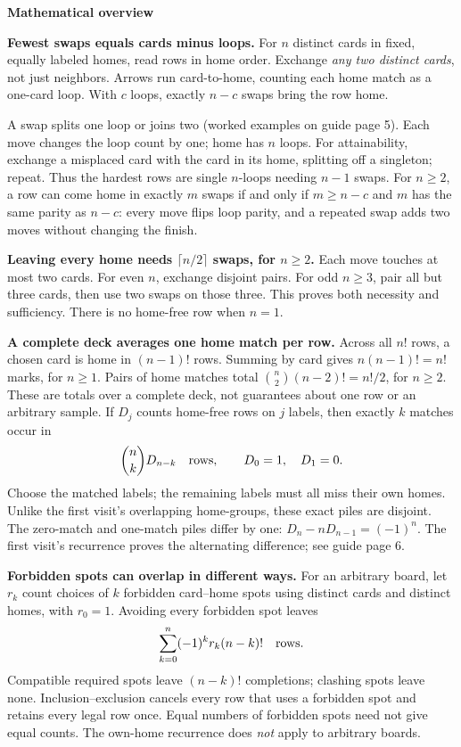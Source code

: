 \documentclass[11pt]{article}
\newcommand{\head}[1]{\par\textbf{\large #1}\par}
\begin{document}
\head{Mathematical overview}
\textbf{Fewest swaps equals cards minus loops.} For $n$ distinct cards in fixed, equally labeled homes, read rows in home order. Exchange \emph{any two distinct cards}, not just neighbors. Arrows run card-to-home, counting each home match as a one-card loop. With $c$ loops, exactly $n-c$ swaps bring the row home.

A swap splits one loop or joins two (worked examples on guide page 5). Each move changes the loop count by one; home has $n$ loops. For attainability, exchange a misplaced card with the card in its home, splitting off a singleton; repeat. Thus the hardest rows are single $n$-loops needing $n-1$ swaps. For $n\ge2$, a row can come home in exactly $m$ swaps if and only if $m\ge n-c$ and $m$ has the same parity as $n-c$: every move flips loop parity, and a repeated swap adds two moves without changing the finish.

\textbf{Leaving every home needs $\lceil n/2\rceil$ swaps, for $n\ge2$.} Each move touches at most two cards. For even $n$, exchange disjoint pairs. For odd $n\ge3$, pair all but three cards, then use two swaps on those three. This proves both necessity and sufficiency. There is no home-free row when $n=1$.

\textbf{A complete deck averages one home match per row.} Across all $n!$ rows, a chosen card is home in $(n-1)!$ rows. Summing by card gives $n(n-1)!=n!$ marks, for $n\ge1$. Pairs of home matches total $\binom n2(n-2)!=n!/2$, for $n\ge2$. These are totals over a complete deck, not guarantees about one row or an arbitrary sample. If $D_j$ counts home-free rows on $j$ labels, then exactly $k$ matches occur in
\[
\binom nk D_{n-k}\quad\hbox{rows},\qquad D_0=1,\quad D_1=0.
\]
Choose the matched labels; the remaining labels must all miss their own homes. Unlike the first visit's overlapping home-groups, these exact piles are disjoint. The zero-match and one-match piles differ by one: $D_n-nD_{n-1}=(-1)^n$. The first visit's recurrence proves the alternating difference; see guide page 6.

\textbf{Forbidden spots can overlap in different ways.} For an arbitrary board, let $r_k$ count choices of $k$ forbidden card--home spots using distinct cards and distinct homes, with $r_0=1$. Avoiding every forbidden spot leaves
\[
\sum_{k=0}^{n}(-1)^k r_k(n-k)!\quad\hbox{rows}.
\]
Compatible required spots leave $(n-k)!$ completions; clashing spots leave none. Inclusion--exclusion cancels every row that uses a forbidden spot and retains every legal row once. Equal numbers of forbidden spots need not give equal counts. The own-home recurrence does \emph{not} apply to arbitrary boards.
\end{document}
